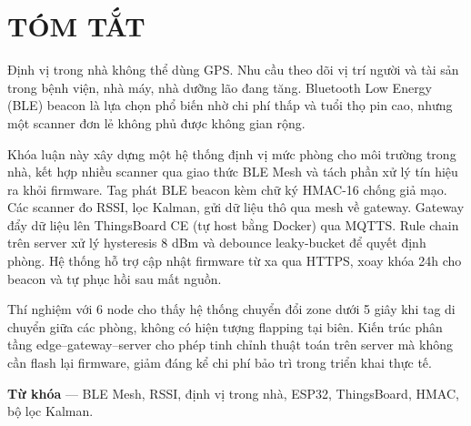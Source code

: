 \chapter*{TÓM TẮT}
\label{tomtat}

Định vị trong nhà không thể dùng GPS. Nhu cầu theo dõi vị trí người và tài sản trong bệnh viện, nhà máy, nhà dưỡng lão đang tăng. Bluetooth Low Energy (BLE) beacon là lựa chọn phổ biến nhờ chi phí thấp và tuổi thọ pin cao, nhưng một scanner đơn lẻ không phủ được không gian rộng.

Khóa luận này xây dựng một hệ thống định vị mức phòng cho môi trường trong nhà, kết hợp nhiều scanner qua giao thức BLE Mesh và tách phần xử lý tín hiệu ra khỏi firmware. Tag phát BLE beacon kèm chữ ký HMAC-16 chống giả mạo. Các scanner đo RSSI, lọc Kalman, gửi dữ liệu thô qua mesh về gateway. Gateway đẩy dữ liệu lên ThingsBoard CE (tự host bằng Docker) qua MQTTS. Rule chain trên server xử lý hysteresis 8 dBm và debounce leaky-bucket để quyết định phòng. Hệ thống hỗ trợ cập nhật firmware từ xa qua HTTPS, xoay khóa 24h cho beacon và tự phục hồi sau mất nguồn.

Thí nghiệm với 6 node cho thấy hệ thống chuyển đổi zone dưới 5 giây khi tag di chuyển giữa các phòng, không có hiện tượng flapping tại biên. Kiến trúc phân tầng edge--gateway--server cho phép tinh chỉnh thuật toán trên server mà không cần flash lại firmware, giảm đáng kể chi phí bảo trì trong triển khai thực tế.

\textbf{Từ khóa} --- BLE Mesh, RSSI, định vị trong nhà, ESP32, ThingsBoard, HMAC, bộ lọc Kalman.
